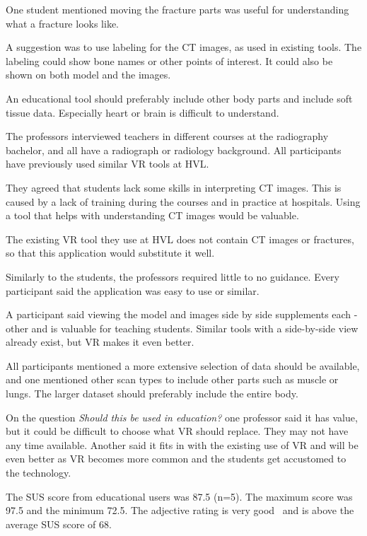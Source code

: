 \documentclass[a4paper]{report}
\begin{document}
One student mentioned moving the fracture parts was useful for understanding what a fracture looks like.

A suggestion was to use labeling for the CT images, as used in existing tools. The labeling could show bone names or other points of interest. It could also be shown on both model and the images.

An educational tool should preferably include other body parts and include soft tissue data. Especially heart or brain is difficult to understand.


The professors interviewed teachers in different courses at the radiography bachelor, and all have a radiograph or radiology background. 
All participants have previously used similar VR tools at HVL.

They agreed that students lack some skills in interpreting CT images. This is caused by a lack of training during the courses and in practice at hospitals. Using a tool that helps with understanding CT images would be valuable. 

The existing VR tool they use at HVL does not contain CT images or fractures, so that this application would substitute it well.

Similarly to the students, the professors required little to no guidance. Every participant said the application was easy to use or similar.

A participant said viewing the model and images side by side supplements each -other and is valuable for teaching students. Similar tools with a side-by-side view already exist, but VR makes it even better.

All participants mentioned a more extensive selection of data should be available, and one mentioned other scan types to include other parts such as muscle or lungs. The larger dataset should preferably include the entire body.


On the question \emph{Should this be used in education?} one professor said it has value, but it could be difficult to choose what VR should replace. They may not have any time available. Another said it fits in with the existing use of VR and will be even better as VR becomes more common and the students get accustomed to the technology.

The SUS score from educational users was 87.5 (n=5). The maximum score was 97.5 and the minimum 72.5. The adjective rating is very good~\cite{bangor_empirical_2008} and is above the average SUS score of 68.
\end{document}
